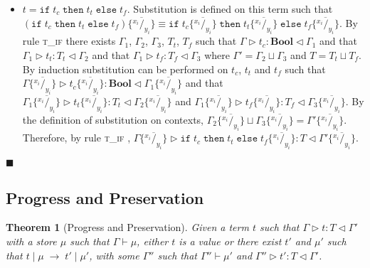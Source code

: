 \documentclass{article}
\newtheorem{thm}{Theorem}
\newcommand{\tif}{\textsc{t\_if} }
\newcommand{\tmethc}{\textsc{t\_meth\_call} }
\newcommand{\typerule}[4]{#1 \triangleright #2 : #3 \triangleleft #4}
\newcommand{\oprule}[4]{#1 \mid #2\;\longrightarrow\;#3 \mid #4}
\newcommand{\subst}[3]{#3 \{\overline{^{#1}/_{#2}}\}}
\newcommand{\substxy}[1]{\subst{x_i}{y_i}{#1}}
\newcommand{\boolt}{\mathbf{Bool}}
\newcommand{\ift}[3]{\mathtt{if} \; #1 \; \mathtt{then} \; #2 \; \mathtt{else} \; #3}
\newcommand{\qed}{$\blacksquare$}
\newenvironment{proof}{\vspace{1ex}\noindent{\bf Proof}\hspace{0.5em}}
  {\hfill\qed\vspace{1ex}}
\begin{document}
\begin{proof}
\begin{itemize}
Rule \tmethc requires that $x$ exist in both $\Gamma$ and $\Gamma'$ and
therefore any substitution of x in the term will be matched with the
same substitution in the contexts. Therefore, $t$ can be typed by
\tmethc after the substitution.

\item $t = \ift{t_c}{t_t}{t_f}$. Substitution is defined on this term such
that \\
$\subst{x_i}{y_i}{(\ift{t_c}{t_t}{t_f})} \equiv 
\ift{\substxy{t_c}}{\substxy{t_t}}{\substxy{t_f}}$.
By rule \tif there exists $\Gamma_1$, $\Gamma_2$, $\Gamma_3$, $T_t$, $T_f$
such that
$\typerule{\Gamma}{t_c}{\boolt}{\Gamma_1}$ and that
$\typerule{\Gamma_1}{t_t}{T_t}{\Gamma_2}$ and that
$\typerule{\Gamma_1}{t_f}{T_f}{\Gamma_3}$ where
$\Gamma' = \Gamma_2 \sqcup \Gamma_3$ and $T = T_t \sqcup T_f$. By induction
substitution can be performed on $t_c$, $t_t$ and $t_f$ such that
$\typerule{\substxy{\Gamma}}{\substxy{t_c}}{\boolt}{\substxy{\Gamma_1}}$ and that
$\typerule{\substxy{\Gamma_1}}{\substxy{t_t}}{T_t}{\substxy{\Gamma_2}}$ and
$\typerule{\substxy{\Gamma_1}}{\substxy{t_f}}{T_f}{\substxy{\Gamma_3}}$.
By the definition of substitution on contexts, 
$\substxy{\Gamma_2} \sqcup \substxy{\Gamma_3} = \substxy{\Gamma'}$. Therefore,
by rule \tif, 
$\typerule{\substxy{\Gamma}}{\substxy{\ift{t_c}{t_t}{t_f}}}{T}{\substxy{\Gamma'}}$.
\end{itemize}
\end{proof}

\subsection{Progress and Preservation}

\begin{thm}[Progress and Preservation]
Given a term $t$ such that $\typerule{\Gamma}{t}{T}{\Gamma'}$
with a store $\mu$ such that $\Gamma \vdash \mu$, either $t$ is a value or 
there exist $t'$ and $\mu'$ such that
$\oprule{t}{\mu}{t'}{\mu'}$, with some $\Gamma''$ such that
$\Gamma'' \vdash \mu'$ and $\typerule{\Gamma''}{t'}{T}{\Gamma'}$.
\end{thm}
\end{document}
